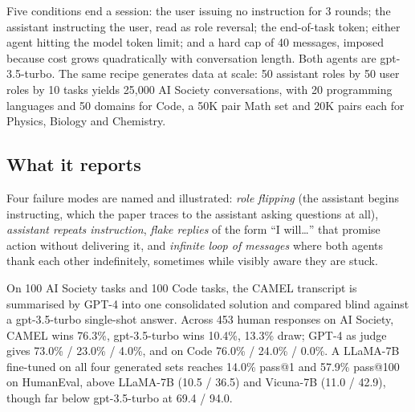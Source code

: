\begin{center}
\end{center}

Five conditions end a session: the user issuing no instruction for 3 rounds; the assistant instructing the user, read as role reversal; the end-of-task token; either agent hitting the model token limit; and a hard cap of 40 messages, imposed because cost grows quadratically with conversation length. Both agents are gpt-3.5-turbo. The same recipe generates data at scale: 50 assistant roles by 50 user roles by 10 tasks yields 25,000 AI Society conversations, with 20 programming languages and 50 domains for Code, a 50K pair Math set and 20K pairs each for Physics, Biology and Chemistry.

\subsection{What it reports}

Four failure modes are named and illustrated: \emph{role flipping} (the assistant begins instructing, which the paper traces to the assistant asking questions at all), \emph{assistant repeats instruction}, \emph{flake replies} of the form ``I will\ldots'' that promise action without delivering it, and \emph{infinite loop of messages} where both agents thank each other indefinitely, sometimes while visibly aware they are stuck.

On 100 AI Society tasks and 100 Code tasks, the CAMEL transcript is summarised by GPT-4 into one consolidated solution and compared blind against a gpt-3.5-turbo single-shot answer. Across 453 human responses on AI Society, CAMEL wins 76.3\%, gpt-3.5-turbo wins 10.4\%, 13.3\% draw; GPT-4 as judge gives 73.0\% / 23.0\% / 4.0\%, and on Code 76.0\% / 24.0\% / 0.0\%. A LLaMA-7B fine-tuned on all four generated sets reaches 14.0\% pass@1 and 57.9\% pass@100 on HumanEval, above LLaMA-7B (10.5 / 36.5) and Vicuna-7B (11.0 / 42.9), though far below gpt-3.5-turbo at 69.4 / 94.0.

